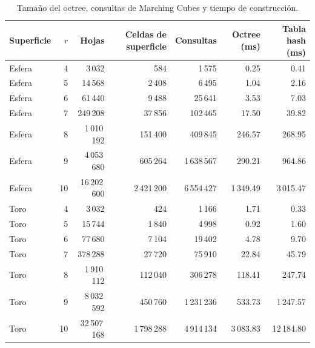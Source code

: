 \begin{table}[htbp]
\centering
\caption{Tamaño del octree, consultas de Marching Cubes y tiempo de construcción.}
\label{tab:obj2_hojas}
\begin{tabular}{lrrrrrr}
\toprule
Superficie & $r$ & Hojas & Celdas de superficie & Consultas & Octree (ms) & Tabla hash (ms) \\
\midrule
Esfera & 4  &      3\,032 &       584 &     1\,575 &     0.25 &      0.41 \\
Esfera & 5  &     14\,568 &     2\,408 &     6\,495 &     1.04 &      2.16 \\
Esfera & 6  &     61\,440 &     9\,488 &    25\,641 &     3.53 &      7.03 \\
Esfera & 7  &    249\,208 &    37\,856 &   102\,465 &    17.50 &     39.82 \\
Esfera & 8  &  1\,010\,192 &   151\,400 &   409\,845 &   246.57 &    268.95 \\
Esfera & 9  &  4\,053\,680 &   605\,264 & 1\,638\,567 &   290.21 &    964.86 \\
Esfera & 10 & 16\,202\,600 & 2\,421\,200 & 6\,554\,427 &  1\,349.49 &  3\,015.47 \\
\midrule
Toro & 4  &      3\,032 &       424 &     1\,166 &     1.71 &      0.33 \\
Toro & 5  &     15\,744 &     1\,840 &     4\,998 &     0.92 &      1.60 \\
Toro & 6  &     77\,680 &     7\,104 &    19\,402 &     4.78 &      9.70 \\
Toro & 7  &    378\,288 &    27\,720 &    75\,910 &    22.84 &     45.79 \\
Toro & 8  &  1\,910\,112 &   112\,040 &   306\,278 &   118.41 &    247.74 \\
Toro & 9  &  8\,032\,592 &   450\,760 & 1\,231\,236 &   533.73 &  1\,247.57 \\
Toro & 10 & 32\,507\,168 & 1\,798\,288 & 4\,914\,134 &  3\,083.83 & 12\,184.80 \\
\bottomrule
\end{tabular}
\end{table}

